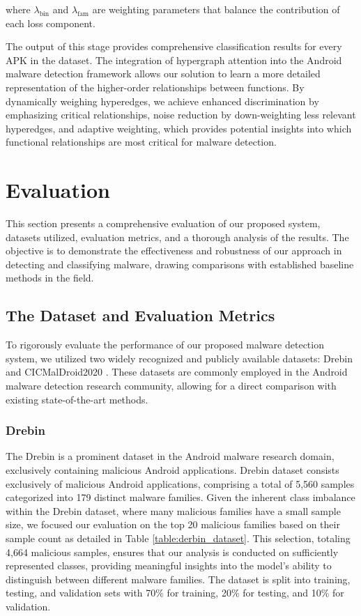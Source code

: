 \documentclass[runningheads]{llncs}
\begin{document}
where $\lambda_{\text{bin}}$ and $\lambda_{\text{fam}}$ are weighting parameters that balance the contribution of each loss component. 

The output of this stage provides comprehensive classification results for every APK in the dataset.
The integration of hypergraph attention into the Android malware detection framework allows our solution to learn a more detailed representation of the higher-order relationships between functions. By dynamically weighing hyperedges, we achieve enhanced discrimination by emphasizing critical relationships, noise reduction by down-weighting less relevant hyperedges, and adaptive weighting, which provides potential insights into which functional relationships are most critical for malware detection. 




\section{Evaluation}
This section presents a comprehensive evaluation of our proposed system, datasets utilized, evaluation metrics, and a thorough analysis of the results. The objective is to demonstrate the effectiveness and robustness of our approach in detecting and classifying malware, drawing comparisons with established baseline methods in the field.


\subsection{The Dataset and Evaluation Metrics}
To rigorously evaluate the performance of our proposed malware detection system, we utilized two widely recognized and publicly available datasets: Drebin \cite{arp2014} and CICMalDroid2020 \cite{mahdavifar2020dynamic,mahdavifar2022effective}. These datasets are commonly employed in the Android malware detection research community, allowing for a direct comparison with existing state-of-the-art methods.

\subsubsection{Drebin}
The Drebin is a prominent dataset in the Android malware research domain, exclusively containing malicious Android applications. Drebin dataset consists exclusively of malicious Android applications, comprising a total of 5,560 samples categorized into 179 distinct malware families.
Given the inherent class imbalance within the Drebin dataset, where many malicious families have a small sample size, we focused our evaluation on the top 20 malicious families based on their sample count as detailed in Table \ref{table:derbin_dataset}. This selection, totaling 4,664 malicious samples, ensures that our analysis is conducted on sufficiently represented classes, providing meaningful insights into the model's ability to distinguish between different malware families. The dataset is split into training, testing, and validation sets with 70\% for training, 20\% for testing, and 10\% for validation.
\end{document}
